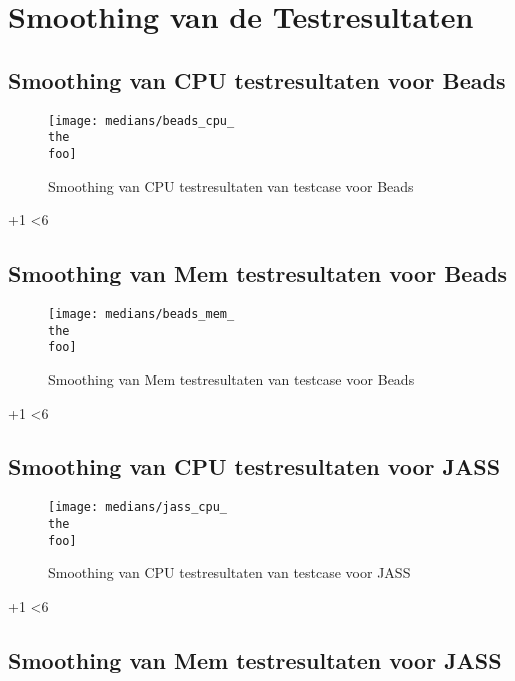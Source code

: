 
\newcount\foo

\chapter{Smoothing van de Testresultaten}
\label{ch:smoothing}

\section{Smoothing van CPU testresultaten voor Beads}

\loop
    
    \begin{figure}
    		\centering
    		\texttt{[image: medians/beads\_cpu\_\\the\\foo]}
    		\caption{Smoothing van CPU testresultaten van testcase \the\foo  voor Beads}
    \end{figure}
  
  \advance \foo +1
\ifnum \foo<6
\repeat

\section{Smoothing van Mem testresultaten voor Beads}

\loop
    
    \begin{figure}
    		\centering
    		\texttt{[image: medians/beads\_mem\_\\the\\foo]}
    		\caption{Smoothing van Mem testresultaten van testcase \the\foo  voor Beads}
    \end{figure}
  
  \advance \foo +1
\ifnum \foo<6
\repeat

\section{Smoothing van CPU testresultaten voor JASS}

\loop
    
    \begin{figure}
    		\centering
    		\texttt{[image: medians/jass\_cpu\_\\the\\foo]}
    		\caption{Smoothing van CPU testresultaten van testcase \the\foo  voor JASS}
    \end{figure}
  
  \advance \foo +1
\ifnum \foo<6
\repeat

\section{Smoothing van Mem testresultaten voor JASS}

